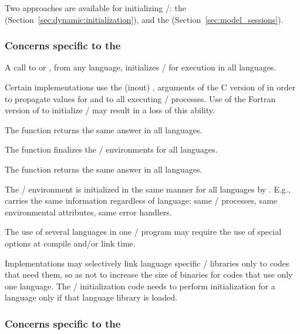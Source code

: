 Two approaches are available for initializing \MPI/: the \wpm{} (Section~\ref{sec:dynamic:initialization}), and the \spm{} (Section~\ref{sec:model_sessions}).

\subsubsection{Concerns specific to the \texorpdfstring{\wpm}{World Model}}

A call to   or
,
from any language,
initializes \MPI/ for execution in all languages.

\begin{users}
Certain implementations use the (inout) ,  arguments of the
C version
of  in order to propagate values for  and
 to all
executing \MPI/ processes.
Use of the Fortran
version of  to initialize \MPI/ may result in a loss
of this ability.
\end{users}

The function  returns the same answer in all
languages.

The function
finalizes the \MPI/ environments for all languages.

The function  returns the same answer in all
languages.

The \MPI/ environment is initialized in the same manner for all languages by
.
E.g.,  carries the same information regardless
of language: same \MPI/ processes, same environmental attributes,
same error handlers.

\begin{users}
The use of several languages  in one \MPI/ program may require the use
of special options at compile and/or link time.
\end{users}

\begin{implementors}
Implementations may selectively link language specific \MPI/ libraries
only to codes that need them, so as not to increase the size of
binaries for codes that use only one language.
The \MPI/ initialization code needs to perform initialization for a language
only if that language library is loaded.
\end{implementors}

\subsubsection{Concerns specific to the \texorpdfstring{\spm}{Sessions Model}}

